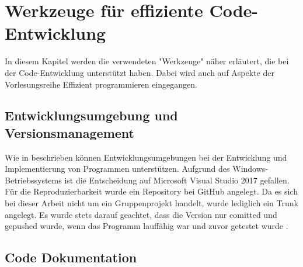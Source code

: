 \chapter{Werkzeuge für effiziente Code-Entwicklung}
In diesem Kapitel werden die verwendeten "Werkzeuge" näher erläutert, die bei der Code-Entwicklung unterstützt haben. Dabei wird auch auf Aspekte der Vorlesungsreihe Effizient programmieren \cite{Kessler.Sommersemester2017} eingegangen.

\section{Entwicklungsumgebung und Versionsmanagement}
Wie in \cite{Kessler.Sommersemester2017} beschrieben können Entwicklungsumgebungen bei der Entwicklung und Implementierung von Programmen unterstützen. Aufgrund des Windows-Betriebssystems ist die Entscheidung auf  Microsoft Visual Studio 2017 gefallen. Für die Reproduzierbarkeit wurde ein Repository bei GitHub angelegt. Da es sich bei dieser Arbeit nicht um ein Gruppenprojekt handelt, wurde lediglich ein Trunk angelegt. Es wurde stets darauf geachtet, dass die Version nur comitted und gepushed wurde, wenn das Programm lauffähig war und zuvor getestet wurde \cite{Kessler.Sommersemester2017}.  
\section{Code Dokumentation}

